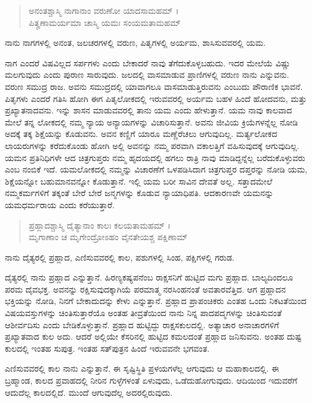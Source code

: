 \begin{verse}
ಅನಂತಶ್ಚಾಸ್ಮಿ ನಾಗಾನಾಂ ವರುಣೋ ಯಾದಸಾಮಹಮ್ ।\\ಪಿತೄಣಾಮರ್ಯಮಾ ಚಾಸ್ಮಿ ಯಮಃ ಸಂಯಮತಾಮಹಮ್ 
\end{verse}

{\small ನಾನು ನಾಗಗಳಲ್ಲಿ ಅನಂತ, ಜಲಚರಗಳಲ್ಲಿ ವರುಣ, ಪಿತೃಗಳಲ್ಲಿ ಅರ್ಯಮ, ಶಾಸಿಸುವವರಲ್ಲಿ ಯಮ.}

ನಾಗ ಎಂದರೆ ವಿಷವಿಲ್ಲದ ಸರ್ಪಗಳು ಎಂದು ಬೇಕಾದರೆ ನಾವು ತೆಗೆದುಕೊಳ್ಳಬಹುದು. ಇದರ ಮೇಲೆಯೆ ವಿಷ್ಣು ಮಲಗುವುದು ಎಂದು ಪುರಾಣ ಸಾರುವುದು. ಜಲದಲ್ಲಿ ವಾಸಮಾಡುವ ಪ್ರಾಣಿಗಳಲ್ಲಿ ವರುಣ ನಾನು ಎನ್ನುವನು. ವರುಣ ಸಮುದ್ರ ರಾಜ. ಅವನು ಸಮುದ್ರದಲ್ಲಿ ಯಾವಾಗಲೂ ವಾಸಮಾಡುತ್ತಿರುವನು ಎಂಬುದು ಪೌರಾಣಿಕ ಭಾವನೆ. ಪಿತೃಗಳು ಎಂದರೆ ಗತಿಸಿ ಹೋಗಿ ಈಗ ಪಿತೃಲೋಕದಲ್ಲಿ ಇರುವವರಲ್ಲಿ ಅರ್ಯಮ ಬಹಳ ಹಿಂದೆ ಹೋದವನು, ಮತ್ತು ಪ್ರಖ್ಯಾತನಾದವನು. ಇನ್ನು ಶಾಸನ ಮಾಡುವವರಲ್ಲಿ ತಾನು ಯಮ ಎಂದು ಹೇಳುತ್ತಾನೆ. ಯಮ ನಾವು ಕಾಲವಾದ ಮೇಲೆ ತನ್ನ ಲೋಕದಲ್ಲಿ ನಮ್ಮ ನ್ಯಾಯ ಅನ್ಯಾಯಗಳನ್ನು ವಿಚಾರಿಸುತ್ತಾನೆ. ಅವನು ಜೀವಿಯ ಕ್ರಿಯೆಗಳನ್ನೆಲ್ಲ ನೋಡಿ ಅದಕ್ಕೆ ತಕ್ಕ ಶಿಕ್ಷೆಯನ್ನು ಕೊಡುವನು. ಅವನ ಕಣ್ಣಿಗೆ ಯಾರೂ ಮಣ್ಣೆರೆಚಲು ಆಗುವುದಿಲ್ಲ. ಮರ್ತ್ಯಲೋಕದ ಲಾಯರುಗಳನ್ನು ಕರೆದುಕೊಂಡು ಹೋಗಿ ಅಲ್ಲಿ ಅವನನ್ನು ನಮ್ಮ ಪರವಾಗಿ ವಕಾಲತ್ತಿಗೆ ವಹಿಸುವುದಕ್ಕೆ ಆಗುವುದಿಲ್ಲ. ಯಮನ ಪ್ರತಿನಿಧಿಗಳೇ ಆದ ಚಿತ್ರಗುಪ್ತರು ನಮ್ಮ ಹೃದಯದಲ್ಲಿ ಹಗಲು ರಾತ್ರಿ ನಾವು ಮಾಡಿದ್ದನ್ನೆಲ್ಲ ಬರೆದುಕೊಳ್ಳುವರು ಎಂಬ ನಂಬಿಕೆ ಇದೆ. ಯಮಲೋಕದಲ್ಲಿ ನಮ್ಮನ್ನು ವಿಚಾರಣೆಗೆ ಒಳಪಡಿಸಿದಾಗ ಚಿತ್ರಗುಪ್ತರ ದಪ್ತರನ್ನು ನೋಡಿ ಯಮ, ಶಿಕ್ಷೆಯನ್ನೋ ಬಹುಮಾನವನ್ನೋ ಕೊಡುತ್ತಾನೆ. ಇಲ್ಲಿ ಯಮ ಬರೀ ಸಾವಿನ ದೇವತೆ ಅಲ್ಲ. ಸತ್ತಾದಮೇಲೆ ನಮ್ಮಕರ್ಮಗಳಿಗೆ ತಕ್ಕಂತೆ ಬೇರೆ ಬೇರೆ ಜನ್ಮಗಳನ್ನು ಕೊಡುವ ನ್ಯಾಯಾಧಿಪತಿ. ಆದಕಾರಣವೇ ಯಮನನ್ನು ಯಮಧರ್ಮರಾಯ ಎಂದು ಕರೆಯುತ್ತಾರೆ.

\begin{verse}
ಪ್ರಹ್ಲಾದಶ್ಚಾಸ್ಮಿ ದೈತ್ಯಾನಾಂ ಕಾಲಃ ಕಲಯತಾಮಹಮ್ ।\\ಮೃಗಾಣಾಂ ಚ ಮೃಗೇಂದ್ರೋಽಹಂ ವೈನತೇಯಶ್ಚ ಪಕ್ಷಿಣಾಮ್ 
\end{verse}

{\small ನಾನು ದೈತ್ಯರಲ್ಲಿ ಪ್ರಹ್ಲಾದ, ಎಣಿಸುವವರಲ್ಲಿ ಕಾಲ, ಪಶುಗಳಲ್ಲಿ ಸಿಂಹ, ಪಕ್ಷಿಗಳಲ್ಲಿ ಗರುಡ.}

ದೈತ್ಯರಲ್ಲಿ ನಾನು ಪ್ರಹ್ಲಾದ ಎನ್ನುತ್ತಾನೆ. ಹಿರಣ್ಯಕಷ್ಯಪನೆಂಬ ರಾಕ್ಷಸನಿಗೆ ಹುಟ್ಟಿದ ಮಗು ಪ್ರಹ್ಲಾದ. ಬಾಲ್ಯದಿಂದಲೂ ಪರಮ ದೈವಭಕ್ತ. ಅವನನ್ನು ರಕ್ಷಿಸುವುದಕ್ಕಾಗಿಯೆ ಪರಮಾತ್ಮ ನರಸಿಂಹನಂತೆ ಅವತಾರವೆತ್ತಿದ. ಆಗ ಪ್ರಹ್ಲಾದನ ಭಕ್ತಿಯನ್ನು ನೋಡಿ, ನಿನಗೆ ಬೇಕಾದುದನ್ನು ಕೇಳು ಎನ್ನುತ್ತಾನೆ. ಪ್ರಹ್ಲಾದ ಪ್ರಾಪಂಚಿಕರು ಎಂತಹ ಒಂದು ನಿಕಟತೆಯಿಂದ ವಿಷಯವಸ್ತುಗಳನ್ನು ಚಿಂತಿಸುತ್ತಾರೆಯೊ ಅಂತಹ ತೀವ್ರತೆಯಿಂದ ನಾನು ನಿನ್ನ ಪಾದಪದ್ಮಗಳನ್ನು ಚಿಂತಿಸುವಂತೆ ಆಶೀರ್ವದಿಸು ಎಂದು ಬೇಡಿಕೊಳ್ಳುತ್ತಾನೆ. ಪ್ರಹ್ಲಾದ ಹುಟ್ಟಿದ್ದು ರಾಕ್ಷಸಕುಲದಲ್ಲಿ. ಅತ್ಯಾಚಾರ ಅನಾಚಾರಗಳಿಗೆ ಪ್ರಖ್ಯಾತವಾದ ಕುಲ ಅದು. ಆದರೆ ಅಲ್ಲಿಯೇ ಕೆಸರಿನಲ್ಲಿ ಹುಟ್ಟಿದ ಕಮಲದಂತೆ ಪ್ರಹ್ಲಾದ ಜನಿಸುವನು. ಅಂತಹ ದುಷ್ಟ ಕುಲದಲ್ಲಿ ಇಂತಹ ಸುಪುತ್ರ. ಇಂತಹ ಸತ್​ಪುತ್ರನ ಹಿಂದೆ ಇರುವವನೇ ಭಗವಂತ.

ಎಣಿಸುವವರಲ್ಲಿ ಕಾಲ ನಾನು ಎನ್ನುತ್ತಾನೆ. ಈ ಸೃಷ್ಟಿಸ್ಥಿತಿ ಪ್ರಳಯಗಳೆಲ್ಲ ಆಗುವುದು ಆ ಮಹಾಕಾಲದಲ್ಲಿ. ಈ ಬ್ರಹ್ಮಾಂಡ, ಕಾಲದ ಪ್ರವಾಹದಲ್ಲಿ ನೀರಿನ ಗುಳ್ಳೆಗಳಂತೆ ಏಳುವುದು, ಒಡೆದುಹೋಗುವುದು. ಆದಿಯಿಂದ ಇದುವರೆಗೆ ಆದುದೆಲ್ಲ ಕಾಲದಲ್ಲಿದೆ. ಮುಂದೆ ಆಗುವುದೆಲ್ಲ ಅದರಲ್ಲಿರುವುದು.

